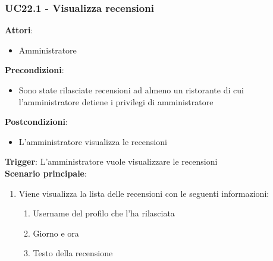\subsubsection{UC22.1 - Visualizza recensioni}\label{usecase:22_1}
\textbf{Attori}:
\begin{itemize}
    \item Amministratore
\end{itemize}
\textbf{Precondizioni}:
\begin{itemize}
    \item Sono state rilasciate recensioni ad almeno un ristorante di cui l'amministratore detiene i privilegi di amministratore
\end{itemize}
\textbf{Postcondizioni}:
\begin{itemize}
    \item L'amministratore visualizza le recensioni
\end{itemize}
\textbf{Trigger}:
L'amministratore vuole visualizzare le recensioni\\
\textbf{Scenario principale}:
\begin{enumerate}
    \item Viene visualizza la lista delle recensioni con le seguenti informazioni:
    \begin{enumerate}
        \item Username del profilo che l'ha rilasciata
        \item Giorno e ora
        \item Testo della recensione
    \end{enumerate}
\end{enumerate}